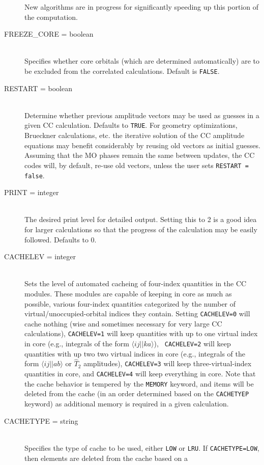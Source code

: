 \begin{description}
New algorithms are in progress for significantly speeding up this portion
of the computation.
\item[FREEZE\_CORE = boolean]\mbox{}\\
Specifies whether core orbitals (which are determined automatically) are to
be excluded from the correlated calculations.  Default is {\tt FALSE}.
\item[RESTART = boolean]\mbox{}\\ Determine whether previous amplitude
vectors may be used as guesses in a given CC calculation.  Defaults to
{\tt TRUE}. For geometry optimizations, Brueckner calculations, etc. the
iterative solution of the CC amplitude equations may benefit considerably
by reusing old vectors as initial guesses.  Assuming that the MO phases
remain the same between updates, the CC codes will, by default, re-use
old vectors, unless the user sets {\tt RESTART = false}.
\item[PRINT = integer]\mbox{}\\
The desired print level for detailed output.  Setting this to 2 is a good
idea for larger calculations so that the progress of the calculation may be
easily followed.  Defaults to 0.
\item[CACHELEV = integer]\mbox{}\\
Sets the level of automated cacheing of four-index quantities in the CC
modules.   These modules are capable of keeping in core as much as
possible, various four-index quantities categorized by the number of
virtual/unoccupied-orbital indices they contain.  Setting {\tt CACHELEV=0}
will cache nothing (wise and sometimes necessary for very large CC 
calculations), {\tt CACHELEV=1} will keep quantities with up to one virtual
index in core (e.g., integrals of the form $\langle ij||ka\rangle$), {\tt
CACHELEV=2} will keep quantities with up two two virtual indices in core
(e.g., integrals of the form $\langle ij||ab \rangle$ or $\hat{T}_2$
amplitudes), {\tt CACHELEV=3} will keep three-virtual-index quantities in
core, and {\tt CACHELEV=4} will keep everything in core.  Note that the
cache behavior is tempered by the {\tt MEMORY} keyword, and items will be
deleted from the cache (in an order determined based on the {\tt CACHETYEP}
keyword) as additional memory is required in a given calculation.
\item[CACHETYPE = string]\mbox{}\\
Specifies the type of cache to be used, either {\tt LOW} or {\tt LRU}.  If
{\tt CACHETYPE=LOW}, then elements are deleted from the cache based on a

\end{description}
